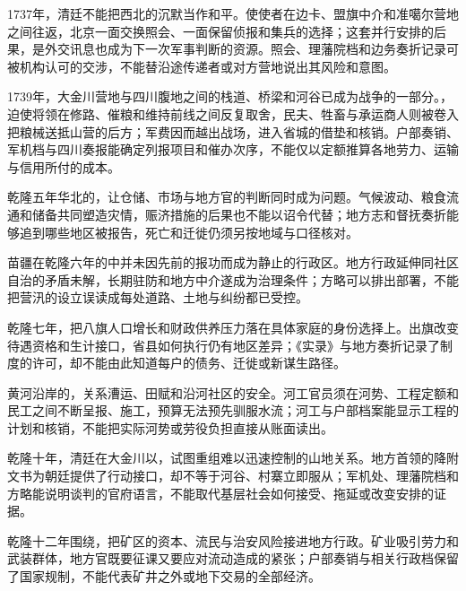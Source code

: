 1737年，清廷不能把西北的沉默当作和平。使使者在边卡、盟旗中介和准噶尔营地之间往返，北京一面交换照会、一面保留侦报和集兵的选择；这套并行安排的后果，是外交讯息也成为下一次军事判断的资源。照会、理藩院档和边务奏折记录可被机构认可的交涉，不能替沿途传递者或对方营地说出其风险和意图。

1739年，大金川营地与四川腹地之间的栈道、桥梁和河谷已成为战争的一部分。，迫使将领在修路、催粮和维持前线之间反复取舍，民夫、牲畜与承运商人则被卷入把粮械送抵山营的后方；军费因而越出战场，进入省城的借垫和核销。户部奏销、军机档与四川奏报能确定列报项目和催办次序，不能仅以定额推算各地劳力、运输与信用所付的成本。

乾隆五年华北的，让仓储、市场与地方官的判断同时成为问题。气候波动、粮食流通和储备共同塑造灾情，赈济措施的后果也不能以诏令代替；地方志和督抚奏折能够追到哪些地区被报告，死亡和迁徙仍须另按地域与口径核对。

苗疆在乾隆六年的中并未因先前的报功而成为静止的行政区。地方行政延伸同社区自治的矛盾未解，长期驻防和地方中介遂成为治理条件；方略可以排出部署，不能把营汛的设立误读成每处道路、土地与纠纷都已受控。

乾隆七年，把八旗人口增长和财政供养压力落在具体家庭的身份选择上。出旗改变待遇资格和生计接口，省县如何执行仍有地区差异；《实录》与地方奏折记录了制度的许可，却不能由此知道每户的债务、迁徙或新谋生路径。

黄河沿岸的，关系漕运、田赋和沿河社区的安全。河工官员须在河势、工程定额和民工之间不断呈报、施工，预算无法预先驯服水流；河工与户部档案能显示工程的计划和核销，不能把实际河势或劳役负担直接从账面读出。

乾隆十年，清廷在大金川以，试图重组难以迅速控制的山地关系。地方首领的降附文书为朝廷提供了行动接口，却不等于河谷、村寨立即服从；军机处、理藩院档和方略能说明谈判的官府语言，不能取代基层社会如何接受、拖延或改变安排的证据。

乾隆十二年围绕，把矿区的资本、流民与治安风险接进地方行政。矿业吸引劳力和武装群体，地方官既要征课又要应对流动造成的紧张；户部奏销与相关行政档保留了国家规制，不能代表矿井之外或地下交易的全部经济。

